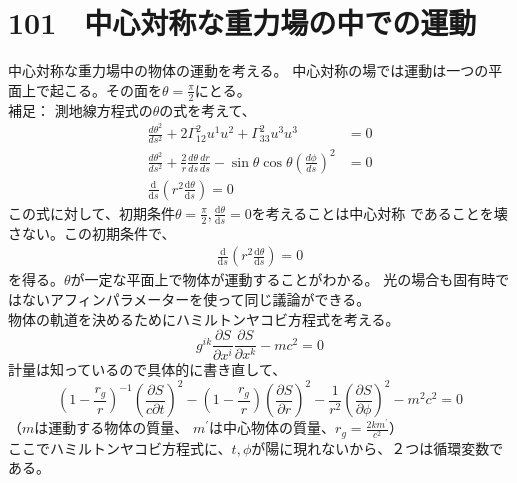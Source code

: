\documentclass{jsarticle}
\newcommand{\pder}[2][]{\frac{\partial#1}{\partial#2}}
\newcommand{\dder}[2][]{\frac{\mathrm{d}#1}{\mathrm{d}#2}}
\newcommand{\beq}{\begin{equation}}
\newcommand{\eeq}{\end{equation}}
\newcommand{\GaT}[3]{\Gamma^{#1}_{#2 #3}}
\newcommand{\revrt}{\frac{1}{r^2}}
\begin{document}
\section{101　中心対称な重力場の中での運動}
中心対称な重力場中の物体の運動を考える。
中心対称の場では運動は一つの平面上で起こる。その面を$\theta = \frac{\pi}{2}$にとる。\\
補足：
測地線方程式の$\theta$の式を考えて、
\begin{align}
    \frac{d\theta^2}{ds^2} + 2\GaT{2}{1}{2} u^1 u^2 + \GaT{2}{3}{3} u^3 u^3 &= 0\\
    \frac{d\theta^2}{ds^2} + \frac{2}{r} \frac{d\theta}{ds} \frac{dr}{ds} - \sin\theta \cos\theta (\frac{d\phi}{ds})^2 &= 0\\
    \dder[]{s} (r^2 \dder[\theta]{s}) = 0
\end{align}    
この式に対して、初期条件$\theta = \frac{\pi}{2}, \dder[\theta]{s} = 0$を考えることは中心対称    であることを壊さない。この初期条件で、 
\begin{align}  
     \dder[]{s} (r^2 \dder[\theta]{s}) = 0 
\end{align}    
を得る。$\theta$が一定な平面上で物体が運動することがわかる。 
光の場合も固有時ではないアフィンパラメーターを使って同じ議論ができる。\\
物体の軌道を決めるためにハミルトンヤコビ方程式を考える。
\beq
g^{ik} \pder[S]{x^i}\pder[S]{x^k} - mc^2 = 0
\eeq
計量は知っているので具体的に書き直して、
\beq\label{eq:hamiltonj}
(1 - \frac{r_g}{r})^{-1} (\frac{\partial S}{c \partial t})^2 - (1 - \frac{r_g}{r})(\pder[S]{r})^2 - \revrt (\pder[S]{\phi})^2 - m^2c^2 = 0
\eeq
（$m$は運動する物体の質量、 $m^\prime$は中心物体の質量、$r_g = \frac{2 k m^\prime}{c^2}$）\\
ここでハミルトンヤコビ方程式に、$t,\phi$が陽に現れないから、２つは循環変数である。\\
\end{document}
